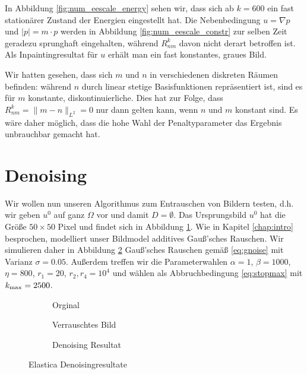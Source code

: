 \documentclass{mythesis}
\begin{document}
In Abbildung \ref{fig:num_eescale_energy} sehen wir, dass sich ab $k = 600$ ein fast stationärer Zustand der Energien eingestellt hat.
Die Nebenbedingung $u = \nabla p$ und $|p| = m\cdot p$ werden in Abbildung \ref{fig:num_eescale_constr} zur selben Zeit geradezu sprunghaft eingehalten, während $R_{nm}^k$ davon nicht derart betroffen ist.
Als Inpaintingresultat für $u$ erhält man ein fast konstantes, graues Bild.

Wir hatten gesehen, dass sich $m$ und $n$ in verschiedenen diskreten Räumen befinden: während $n$ durch linear stetige Basisfunktionen repräsentiert ist, sind es für $m$ konstante, diskontinuierliche.
Dies hat zur Folge, dass $R_{nm}^k = \|m-n\|_{L^2} = 0$ nur dann gelten kann, wenn $n$ und $m$ konstant sind.
Es wäre daher möglich, dass die hohe Wahl der Penaltyparameter das Ergebnis unbrauchbar gemacht hat.




\section*{Denoising}


Wir wollen nun unseren Algorithmus zum Entrauschen von Bildern testen, d.h. wir geben $u^0$ auf ganz $\Omega$ vor und damit $D = \emptyset$.
Das Ursprungsbild $u^0$ hat die Größe $50\times 50$ Pixel und findet sich in Abbildung \ref{fig:num_denoise_orig}.
Wie in Kapitel \ref{chap:intro} besprochen, modelliert unser Bildmodel additives Gauß'sches Rauschen.
Wir simulieren daher in Abbildung \ref{fig:num_denoise_noise} Gauß'sches Rauschen gemäß \eqref{eq:gnoise} mit Varianz $\sigma = 0.05$.
Außerdem treffen wir die Parameterwahlen $\alpha = 1$, $\beta = 1000$, $\eta = 800$, $r_1 = 20$, $r_2, r_4 = 10^{4}$ und wählen als Abbruchbedingung \eqref{eq:stopmax} mit $k_{\mathrm{max}} = 2500$.

\begin{figure}[ht]
    \centering
    \begin{subfigure}{0.25\textwidth}
	\centering
	\caption{Orginal}
	\label{fig:num_denoise_orig}
    \end{subfigure}%
    \begin{subfigure}{0.25\textwidth}
	\centering
	\caption{Verrauschtes Bild}
	\label{fig:num_denoise_noise}
    \end{subfigure}%
    \begin{subfigure}{0.25\textwidth}
	\centering
	\caption{Denoising Resultat}
	\label{fig:num_denoise_result}
    \end{subfigure}%
    \caption{Elastica Denoisingresultate}
    \label{fig:num_denoise_png}
\end{figure}
\end{document}
